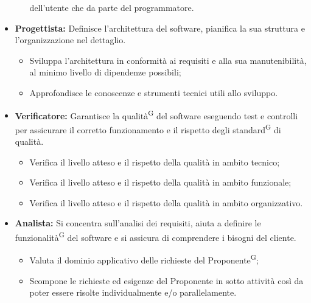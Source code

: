 \documentclass[8pt]{article}
\newcommand{\glossterm}[1]{#1\textsuperscript{G}} %
\begin{document}
\begin{itemize}
\begin{itemize}
        dell'utente che da parte del programmatore.
  \end{itemize}
  \item \textbf{Progettista:} Definisce l'architettura del software, pianifica la sua struttura e l'organizzazione nel dettaglio.
	\begin{itemize}
    \item Sviluppa l'architettura in conformità ai requisiti e alla sua manutenibilità, al minimo
        livello di dipendenze possibili;
    \item Approfondisce le conoscenze e strumenti tecnici utili allo sviluppo.
  \end{itemize}
  \item \textbf{Verificatore:} Garantisce la \glossterm{qualità} del software eseguendo test e controlli per assicurare il corretto funzionamento e il rispetto degli \glossterm{standard} di qualità.
	\begin{itemize}
    \item Verifica il livello atteso e il rispetto della qualità in ambito tecnico;
    \item Verifica il livello atteso e il rispetto della qualità in ambito funzionale;
    \item Verifica il livello atteso e il rispetto della qualità in ambito organizzativo.
  \end{itemize}
  \item \textbf{Analista:} Si concentra sull'analisi dei requisiti, aiuta a definire le \glossterm{funzionalità} del software e si assicura di comprendere i bisogni del cliente.
  \begin{itemize}
    \item Valuta il dominio applicativo delle richieste del \glossterm{Proponente};
    \item Scompone le richieste ed esigenze del Proponente in sotto attività così da poter essere
        risolte individualmente e/o parallelamente.
  \end{itemize}
\end{itemize}
\end{document}
